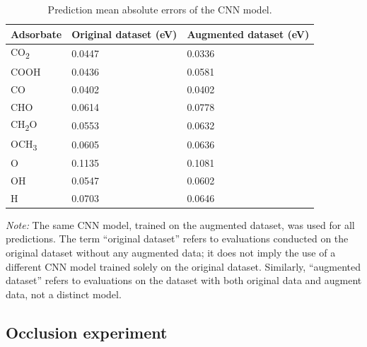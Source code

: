 \begin{table}[htbp]
\label{supp_table18:cnn_mae}
  \caption{Prediction mean absolute errors of the CNN model.}
  \small
  \center
  \begin{tabularx}{0.75\textwidth}{@{}lXX@{}}
    \toprule
    Adsorbate             & Original dataset (eV)  & Augmented dataset (eV)  \\
    \midrule
    CO\textsubscript{2}   & 0.0447                 & 0.0336                  \\
    COOH                  & 0.0436                 & 0.0581                  \\
    CO                    & 0.0402                 & 0.0402                  \\
    CHO                   & 0.0614                 & 0.0778                  \\
    CH\textsubscript{2}O  & 0.0553                 & 0.0632                  \\
    OCH\textsubscript{3}  & 0.0605                 & 0.0636                  \\
    O                     & 0.1135                 & 0.1081                  \\
    OH                    & 0.0547                 & 0.0602                  \\
    H                     & 0.0703                 & 0.0646                  \\
    \bottomrule
  \end{tabularx}

  \smallskip

  \begin{flushright}
  \begin{minipage}{\textwidth}
    \footnotesize\textit{Note:} The same CNN model, trained on the
      augmented dataset, was used for all predictions. The term ``original dataset''
      refers to evaluations conducted on the original dataset without any augmented data;
      it does not imply the use of a different CNN model trained solely on the original dataset.
      Similarly, ``augmented dataset'' refers to evaluations on the dataset with
      both original data and augment data, not a distinct model.
  \end{minipage}
  \end{flushright}
\end{table}

\subsection{Occlusion experiment}
\label{supp_sec3.5_occlusion}

